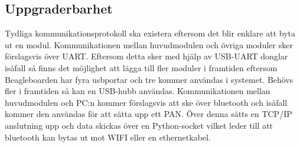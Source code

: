 \subsection{Uppgraderbarhet}
Tydliga kommunikationsprotokoll ska existera eftersom det blir enklare att byta ut en modul. Kommunikationen mellan huvudmodulen och övriga moduler sker förslagsvis över UART. Eftersom detta sker med hjälp av USB-UART donglar isåfall så finns det möjlighet att lägga till fler moduler i framtiden eftersom Beagleboarden har fyra usbportar och tre kommer användas i systemet. Behövs fler i framtiden så kan en USB-hubb användas.
\newline
\newline
Kommunikationen mellan huvudmodulen och PC:n kommer förslagsvis att ske över bluetooth och isåfall kommer den användas för att sätta upp ett PAN. Över denna sätts en TCP/IP anslutning upp och data skickas över en Python-socket vilket leder till att bluetooth kan bytas ut mot WIFI eller en ethernetkabel.
